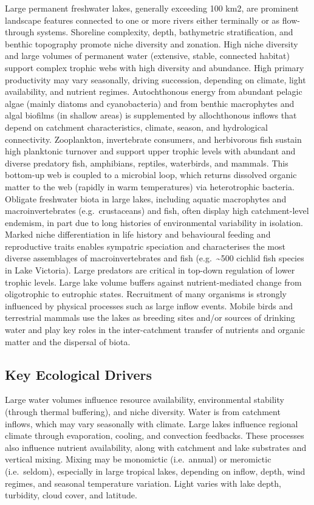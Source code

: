 \documentclass[
  letterpaper,
  DIV=11,
  numbers=noendperiod]{scrartcl}
\begin{document}
Large permanent freshwater lakes, generally exceeding 100 km2, are
prominent landscape features connected to one or more rivers either
terminally or as flow-through systems. Shoreline complexity, depth,
bathymetric stratification, and benthic topography promote niche
diversity and zonation. High niche diversity and large volumes of
permanent water (extensive, stable, connected habitat) support complex
trophic webs with high diversity and abundance. High primary
productivity may vary seasonally, driving succession, depending on
climate, light availability, and nutrient regimes. Autochthonous energy
from abundant pelagic algae (mainly diatoms and cyanobacteria) and from
benthic macrophytes and algal biofilms (in shallow areas) is
supplemented by allochthonous inflows that depend on catchment
characteristics, climate, season, and hydrological connectivity.
Zooplankton, invertebrate consumers, and herbivorous fish sustain high
planktonic turnover and support upper trophic levels with abundant and
diverse predatory fish, amphibians, reptiles, waterbirds, and mammals.
This bottom-up web is coupled to a microbial loop, which returns
dissolved organic matter to the web (rapidly in warm temperatures) via
heterotrophic bacteria. Obligate freshwater biota in large lakes,
including aquatic macrophytes and macroinvertebrates (e.g.~crustaceans)
and fish, often display high catchment-level endemism, in part due to
long histories of environmental variability in isolation. Marked niche
differentiation in life history and behavioural feeding and reproductive
traits enables sympatric speciation and characterises the most diverse
assemblages of macroinvertebrates and fish (e.g.~\textasciitilde500
cichlid fish species in Lake Victoria). Large predators are critical in
top-down regulation of lower trophic levels. Large lake volume buffers
against nutrient-mediated change from oligotrophic to eutrophic states.
Recruitment of many organisms is strongly influenced by physical
processes such as large inflow events. Mobile birds and terrestrial
mammals use the lakes as breeding sites and/or sources of drinking water
and play key roles in the inter-catchment transfer of nutrients and
organic matter and the dispersal of biota.

\subsection{Key Ecological Drivers}\label{key-ecological-drivers-7}

Large water volumes influence resource availability, environmental
stability (through thermal buffering), and niche diversity. Water is
from catchment inflows, which may vary seasonally with climate. Large
lakes influence regional climate through evaporation, cooling, and
convection feedbacks. These processes also influence nutrient
availability, along with catchment and lake substrates and vertical
mixing. Mixing may be monomictic (i.e.~annual) or meromictic
(i.e.~seldom), especially in large tropical lakes, depending on inflow,
depth, wind regimes, and seasonal temperature variation. Light varies
with lake depth, turbidity, cloud cover, and latitude.
\end{document}
